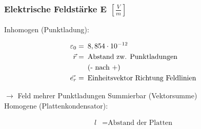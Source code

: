 \subsubsection*{Elektrische Feldstärke E $\left[\frac{V}{m}\right]$}

    Inhomogen (Punktladung):
    \vspace{-1mm}
    \begin{minipage}{0.53\linewidth}
        \begin{footnotesize}
            \begin{center}
            \end{center}
        \end{footnotesize}
    \end{minipage}
    \vspace{1mm}
    \begin{minipage}{0.46\linewidth}
        \begin{scriptsize}
            \begin{center}
                \begin{align*}
                    \varepsilon_0 = &\enspace 8,854\cdot10^{-12}
                    \\\vec{r} = &\text{\enspace Abstand zw. Punktladungen}
                    \\&\text{\enspace(- nach +)}
                    \\\vec{e_r} = &\text{\enspace Einheitsvektor Richtung Feldlinien}
                \end{align*}
            \end{center}
        \end{scriptsize}
    \end{minipage}
    \vspace{2mm}
    $\longrightarrow$ Feld mehrer Punktladungen Summierbar (Vektorsumme)\\
    Homogene (Plattenkondensator):

    \begin{minipage}{0.53\linewidth}
        \begin{footnotesize}
            \begin{center}
            \end{center}
        \end{footnotesize}
    \end{minipage}
    \begin{minipage}{0.46\linewidth}
        \begin{scriptsize}
            \begin{center}
                \begin{align*}
                    l &= \text{Abstand der Platten}
                \end{align*}
            \end{center}
        \end{scriptsize}
    \end{minipage}
    \vspace{1mm}